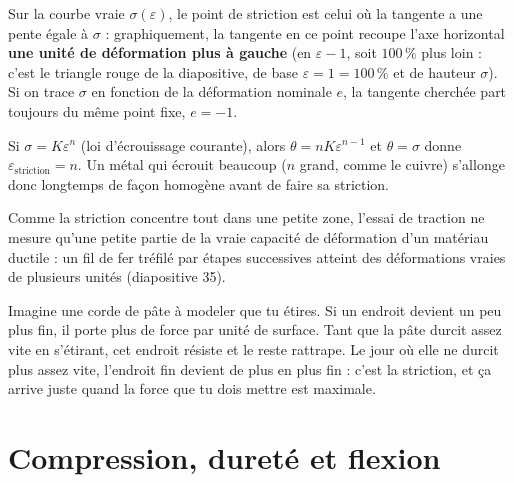 
\begin{propbox}[title=La construction de Considère]
Sur la courbe vraie $\sigma(\varepsilon)$, le point de striction est celui où la tangente a
une pente égale à $\sigma$ : graphiquement, la tangente en ce point recoupe l'axe horizontal
\textbf{une unité de déformation plus à gauche} (en $\varepsilon - 1$, soit $100\,\%$ plus
loin : c'est le triangle rouge de la diapositive, de base $\varepsilon = 1 = 100\,\%$ et de
hauteur $\sigma$). Si on trace $\sigma$ en fonction de la déformation nominale $e$, la
tangente cherchée part toujours du même point fixe, $e = -1$.
\end{propbox}

\begin{exbox}[title={Exemple classique (pas dans les diapositives) : loi puissance}]
Si $\sigma = K\varepsilon^n$ (loi d'écrouissage courante), alors
$\theta = nK\varepsilon^{n-1}$ et $\theta = \sigma$ donne $\varepsilon_{\text{striction}} = n$.
Un métal qui écrouit beaucoup ($n$ grand, comme le cuivre) s'allonge donc longtemps de façon
homogène avant de faire sa striction.
\end{exbox}

\begin{rembox}[title=La traction sous-estime la ductilité]
Comme la striction concentre tout dans une petite zone, l'essai de traction ne mesure qu'une
petite partie de la vraie capacité de déformation d'un matériau ductile : un fil de fer tréfilé
par étapes successives atteint des déformations vraies de plusieurs unités (diapositive 35).
\end{rembox}

\begin{goatbox}
Imagine une corde de pâte à modeler que tu étires. Si un endroit devient un peu plus fin, il
porte plus de force par unité de surface. Tant que la pâte \og durcit\fg{} assez vite en
s'étirant, cet endroit résiste et le reste rattrape. Le jour où elle ne durcit plus assez vite,
l'endroit fin devient de plus en plus fin : c'est la striction, et ça arrive juste quand la
force que tu dois mettre est maximale.
\end{goatbox}

\section{Compression, dureté et flexion}

